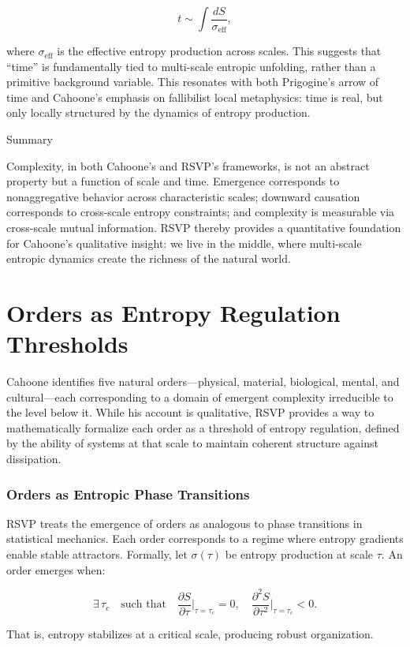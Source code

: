 \documentclass[12pt]{book}
\begin{document}
\[ t \sim \int \frac{dS}{\sigma_{\text{eff}}}, \]

where \( \sigma_{\text{eff}} \) is the effective entropy production across scales. This suggests that “time” is fundamentally tied to multi-scale entropic unfolding, rather than a primitive background variable. This resonates with both Prigogine’s arrow of time and Cahoone’s emphasis on fallibilist local metaphysics: time is real, but only locally structured by the dynamics of entropy production.

Summary

Complexity, in both Cahoone’s and RSVP’s frameworks, is not an abstract property but a function of scale and time. Emergence corresponds to nonaggregative behavior across characteristic scales; downward causation corresponds to cross-scale entropy constraints; and complexity is measurable via cross-scale mutual information. RSVP thereby provides a quantitative foundation for Cahoone’s qualitative insight: we live in the middle, where multi-scale entropic dynamics create the richness of the natural world.

\chapter{Orders as Entropy Regulation Thresholds}
Cahoone identifies five natural orders—physical, material, biological, mental, and cultural—each corresponding to a domain of emergent complexity irreducible to the level below it. While his account is qualitative, RSVP provides a way to mathematically formalize each order as a threshold of entropy regulation, defined by the ability of systems at that scale to maintain coherent structure against dissipation.

\subsection{Orders as Entropic Phase Transitions}
RSVP treats the emergence of orders as analogous to phase transitions in statistical mechanics. Each order corresponds to a regime where entropy gradients enable stable attractors. Formally, let \( \sigma(\tau) \) be entropy production at scale \( \tau \). An order emerges when:

\[ \exists \, \tau_c \quad \text{such that} \quad \frac{\partial S}{\partial \tau}\Big|_{\tau=\tau_c} = 0, \quad \frac{\partial^2 S}{\partial \tau^2}\Big|_{\tau=\tau_c} < 0. \]

That is, entropy stabilizes at a critical scale, producing robust organization.
\end{document}
